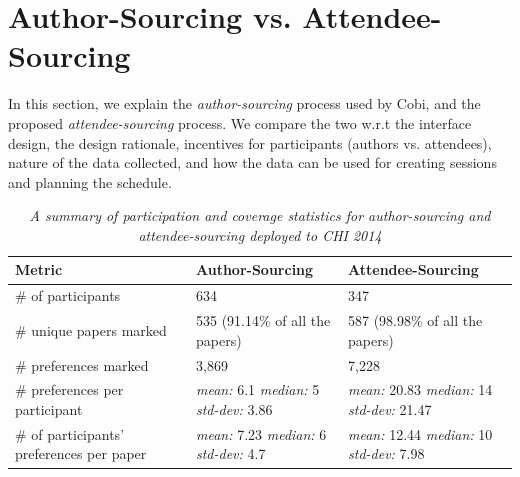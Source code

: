 \documentclass[letterpaper]{article}
\begin{document}
\section{Author-Sourcing vs. Attendee-Sourcing}
In this section, we explain the \emph{author-sourcing} process used by Cobi, and the proposed \emph{attendee-sourcing} process. We compare the two w.r.t the interface design, the design rationale, incentives for participants (authors vs. attendees), nature of the data collected, and how the data can be used for creating sessions and planning the schedule.
\begin{table}[t]
  \centering
\begin{tabular}{ | p{5.5cm} || p{5cm} | p{5.5cm} | }
\hline
\textbf{Metric} & \textbf{Author-Sourcing} & \textbf{Attendee-Sourcing} \\ \hline
\hline
\# of participants & 634 & 347 \\ 
\hline
\# unique papers marked & 535 (91.14\% of all the papers) & 587 (98.98\% of all the papers) \\ 
\hline
\# preferences marked & 3,869 & 7,228 \\
\hline
\# preferences per participant & \emph{mean:} 6.1 \emph{median:} 5 \emph{std-dev:} 3.86  & \emph{mean:} 20.83 \emph{median:} 14 \emph{std-dev:} 21.47 \\
\hline
\# of participants' preferences per paper & \emph{mean:} 7.23 \emph{median:} 6 \emph{std-dev:} 4.7  & \emph{mean:} 12.44 \emph{median:} 10 \emph{std-dev:} 7.98 \\
\hline
\end{tabular}
\caption{\emph{A summary of participation and coverage statistics for author-sourcing and attendee-sourcing deployed to CHI 2014}}
\end{table}
\end{document}
